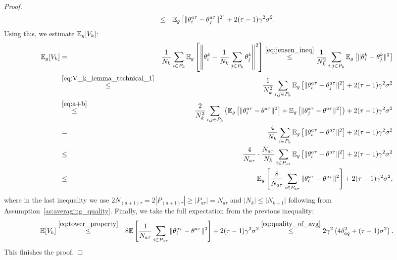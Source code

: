 \begin{proof}
\begin{eqnarray}
        &\le& \mathbb{E}_g\left[\|\theta_i^{a\tau} - \theta_j^{a\tau}\|^2\right] + 2(\tau-1)\gamma^2\sigma^2.\label{eq:V_k_lemma_technical_1}
    \end{eqnarray}
    Using this, we estimate $\mathbb{E}_{g}[V_k]$:
    \begin{eqnarray*}
        \mathbb{E}_g[V_k] &=& \frac{1}{N_k}\sum\limits_{i\in P_k}\mathbb{E}_g\left[\left\|\theta_i^k - \frac{1}{N_k}\sum\limits_{j\in P_k}\theta_j^k\right\|^2\right] \overset{\eqref{eq:jensen_ineq}}{\le} \frac{1}{N_k^2}\sum\limits_{i,j \in P_k}\mathbb{E}_g\left[\|\theta_i^k - \theta_j^k\|^2\right]\\
        &\overset{\eqref{eq:V_k_lemma_technical_1}}{\le}& \frac{1}{N_k^2}\sum\limits_{i,j \in P_k}\mathbb{E}_g\left[\|\theta_i^{a\tau} - \theta_j^{a\tau}\|^2\right] + 2(\tau-1)\gamma^2\sigma^2 \\
        &\overset{\eqref{eq:a+b}}{\le}& \frac{2}{N_k^2}\sum\limits_{i,j \in P_k}\left(\mathbb{E}_g\left[\|\theta_i^{a\tau} - \theta^{a\tau}\|^2\right] + \mathbb{E}_g\left[\|\theta_j^{a\tau} - \theta^{a\tau}\|^2\right]\right) + 2(\tau-1)\gamma^2\sigma^2\\
        &=& \frac{4}{N_k}\sum\limits_{i\in P_k}\mathbb{E}_g\left[\|\theta_i^{a\tau} - \theta^{a\tau}\|^2\right]+ 2(\tau-1)\gamma^2\sigma^2\\
        &\le& \frac{4}{N_{a\tau}}\cdot\frac{N_{a\tau}}{N_k}\sum\limits_{i\in P_{a\tau}}\mathbb{E}_g\left[\|\theta_i^{a\tau} - \theta^{a\tau}\|^2\right]+ 2(\tau-1)\gamma^2\sigma^2\\
        &\le& \mathbb{E}_g\left[\frac{8}{N_{a\tau}}\sum\limits_{i\in P_{a\tau}}\|\theta_i^{a\tau} - \theta^{a\tau}\|^2\right]+ 2(\tau-1)\gamma^2\sigma^2,
    \end{eqnarray*}
    where in the last inequality we use $2N_{(a+1)\tau} = 2|P_{(a+1)\tau}| \ge |P_{a\tau}| = N_{a\tau}$ and $|N_k|\le |N_{k-1}|$ following from Assumption~\ref{as:averaging_quality}. Finally, we take the full expectation from the previous inequality:
    \begin{eqnarray*}
        \mathbb{E}[V_k] &\overset{\eqref{eq:tower_property}}{\le}& 8\mathbb{E}\left[\frac{1}{N_{a\tau}}\sum\limits_{i\in P_{a\tau}}\|\theta_i^{a\tau} - \theta^{a\tau}\|^2\right]+ 2(\tau-1)\gamma^2\sigma^2 \overset{\eqref{eq:quality_of_avg}}{\le} 2\gamma^2\left(4\delta_{aq}^2 + (\tau-1)\sigma^2\right).
    \end{eqnarray*}
    This finishes the proof.
\end{proof}

